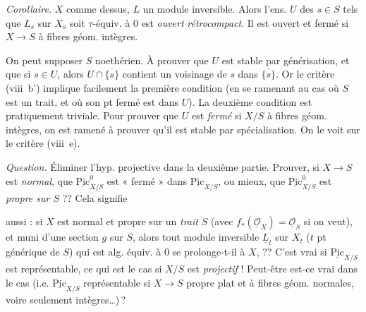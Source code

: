 \documentclass[11pt,a4paper]{article}
\begin{document}
\emph{Corollaire.} $X$ comme dessus, $L$ un module inversible. Alors l'ens. $U$ des $s \in S$ tels que $L_s$ sur $X_s$ soit \struck{\ill{}} $\tau$-équiv. à $0$ est \emph{ouvert} \emph{rétrocompact}. Il est ouvert et fermé si $X \to S$  à fibres géom. intègres.

On peut supposer $S$ noethérien. À prouver que $U$ est stable par générisation, et que si $s \in U$, alors $U \cap \overline{\{s\}}$ \struck{\ill{} \ill{}} contient un voisinage de $s$ dans $\overline{\{s\}}$. Or le critère (viii~b') implique facilement la première condition (en se ramenant au cas où $S$ est un trait, et où son pt fermé \struck{\ill{} \ill{}} est dans $U$). La deuxième condition est pratiquement triviale. Pour prouver que $U$ est \emph{fermé} si $X/S$  à fibres géom. intègres, on est ramené à prouver qu'il est stable par spécialisation. On le voit sur le critère (viii~e).

\emph{Question.} Éliminer l'hyp. projective dans la deuxième partie.
Prouver, si $X \to S$ est \emph{normal}, que $\underline{\mathrm{Pic}}^{0}_{X/S}$ est « fermé » dans $\underline{\mathrm{Pic}}_{X/S}$, ou mieux, que $\underline{\mathrm{Pic}}^{0}_{X/S}$ est \emph{propre sur $S$} ?? Cela signifie

aussi : si $X$ est normal et propre sur  un \emph{trait} $S$ (avec $f_*(\underline{\mathcal{O}}_X) = \underline{\mathcal{O}}_S$ si on veut), et muni d'une section $g$ sur $S$, alors tout module inversible $\underline{L}_t$ sur $X_t$ ($t$ pt générique de $S$) qui est alg. équiv. à $0$ se prolonge-t-il  à $X$,  ?? C'est vrai si $\underline{\mathrm{Pic}}_{X/S}$ est représentable, ce qui  est le cas si $X/S$ est \emph{projectif} ! Peut-être est-ce vrai dans le cas \struck{\ill{}} (i.e. $\underline{\mathrm{Pic}}_{X/S}$ représentable si $X \to S$ propre plat et à fibres géom. normales, voire seulement intègres…)\,?
\end{document}
